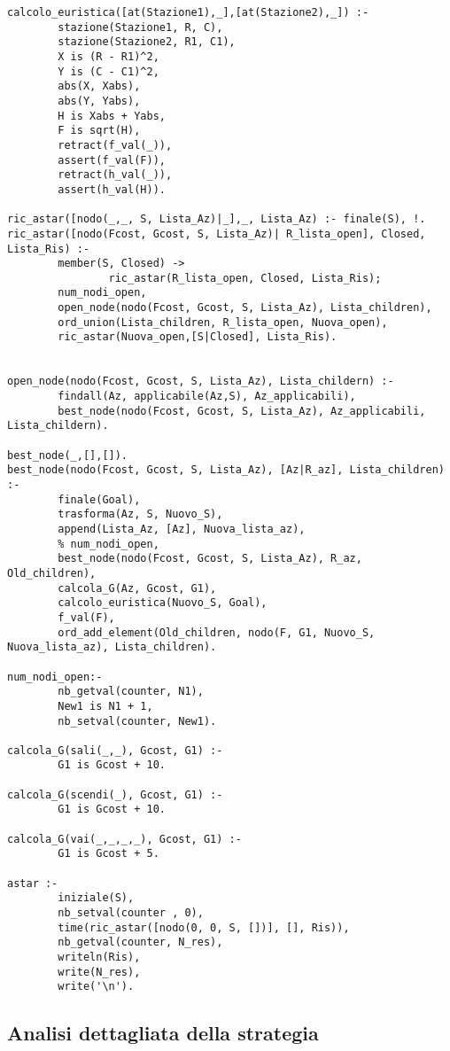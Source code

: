 \begin{lstlisting}
calcolo_euristica([at(Stazione1),_],[at(Stazione2),_]) :-
        stazione(Stazione1, R, C),
        stazione(Stazione2, R1, C1),
        X is (R - R1)^2,
        Y is (C - C1)^2,
        abs(X, Xabs),
        abs(Y, Yabs),
        H is Xabs + Yabs,
        F is sqrt(H),
        retract(f_val(_)),
        assert(f_val(F)),
        retract(h_val(_)),
        assert(h_val(H)).

ric_astar([nodo(_,_, S, Lista_Az)|_],_, Lista_Az) :- finale(S), !.
ric_astar([nodo(Fcost, Gcost, S, Lista_Az)| R_lista_open], Closed, Lista_Ris) :-
        member(S, Closed) ->
                ric_astar(R_lista_open, Closed, Lista_Ris);
        num_nodi_open,
        open_node(nodo(Fcost, Gcost, S, Lista_Az), Lista_children),
        ord_union(Lista_children, R_lista_open, Nuova_open),
        ric_astar(Nuova_open,[S|Closed], Lista_Ris).


open_node(nodo(Fcost, Gcost, S, Lista_Az), Lista_childern) :-
        findall(Az, applicabile(Az,S), Az_applicabili),
        best_node(nodo(Fcost, Gcost, S, Lista_Az), Az_applicabili, Lista_childern).

best_node(_,[],[]).
best_node(nodo(Fcost, Gcost, S, Lista_Az), [Az|R_az], Lista_children) :-
        finale(Goal),
        trasforma(Az, S, Nuovo_S),
        append(Lista_Az, [Az], Nuova_lista_az),
        % num_nodi_open,
        best_node(nodo(Fcost, Gcost, S, Lista_Az), R_az, Old_children),
        calcola_G(Az, Gcost, G1),
        calcolo_euristica(Nuovo_S, Goal),
        f_val(F),
        ord_add_element(Old_children, nodo(F, G1, Nuovo_S, Nuova_lista_az), Lista_children).

num_nodi_open:-
        nb_getval(counter, N1),
        New1 is N1 + 1,
        nb_setval(counter, New1).

calcola_G(sali(_,_), Gcost, G1) :-
        G1 is Gcost + 10.

calcola_G(scendi(_), Gcost, G1) :-
        G1 is Gcost + 10.

calcola_G(vai(_,_,_,_), Gcost, G1) :-
        G1 is Gcost + 5.

astar :-
        iniziale(S),
        nb_setval(counter , 0),
        time(ric_astar([nodo(0, 0, S, [])], [], Ris)),
        nb_getval(counter, N_res),
        writeln(Ris),
        write(N_res),
        write('\n').
\end{lstlisting}

\subsection{Analisi dettagliata della strategia}

